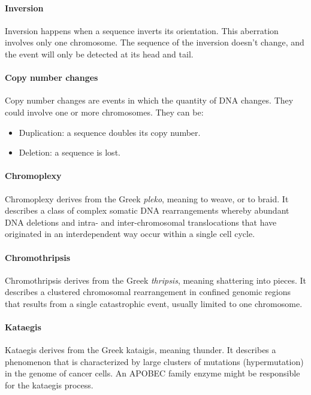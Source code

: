 			\paragraph{Inversion}
			Inversion happens when a sequence inverts its orientation.
			This aberration involves only one chromosome.
			The sequence of the inversion doesn't change, and the event will only be detected at its head and tail.

			\paragraph{Copy number changes}
			Copy number changes are events in which the quantity of DNA changes.
			They could involve one or more chromosomes.
			They can be:

			\begin{multicols}{2}
				\begin{itemize}
					\item Duplication: a sequence doubles its copy number.
					\item Deletion: a sequence is lost.
				\end{itemize}
			\end{multicols}

			\paragraph{Chromoplexy}
			Chromoplexy derives from the Greek \textit{pleko}, meaning to weave, or to braid.
			It describes a class of complex somatic DNA rearrangements whereby abundant DNA deletions and intra- and inter-chromosomal translocations that have originated in an interdependent way occur within a single cell cycle.

			\paragraph*{Chromothripsis}
			Chromothripsis derives from the Greek \textit{thripsis}, meaning shattering into pieces.
			It describes a clustered chromosomal rearrangement in confined genomic regions that results from a single catastrophic event, usually limited to one chromosome.

			\paragraph*{Kataegis}
			Kataegis derives from the Greek kataigis, meaning thunder.
			It describes a phenomenon that is characterized by large clusters of mutations (hypermutation) in the genome of cancer cells.
			An APOBEC family enzyme might be responsible for the kataegis process.

